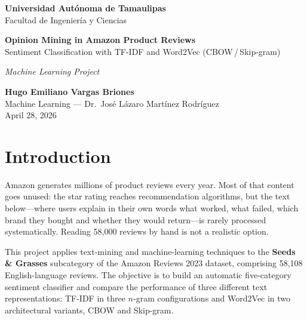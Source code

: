 \documentclass[12pt, letterpaper]{article}
\begin{document}
\begin{titlepage}
  \centering
  \vspace*{2cm}
  {\large\bfseries Universidad Autónoma de Tamaulipas\\[4pt]}
  {\normalsize Facultad de Ingeniería y Ciencias\\[2.5cm]}

  {\LARGE\bfseries Opinion Mining in Amazon Product Reviews\\[8pt]}
  {\large Sentiment Classification with TF-IDF and Word2Vec
    (CBOW\,/\,Skip-gram)\\[1.8cm]}

  {\normalsize\itshape Machine Learning Project\\[1.5cm]}

  {\large\bfseries Hugo Emiliano Vargas Briones\\[6pt]}
  {\normalsize Machine Learning --- Dr.\ José Lázaro Martínez Rodríguez\\[6pt]}
  {\normalsize April 28, 2026}

  \vfill
\end{titlepage}

\tableofcontents
\newpage

\section{Introduction}

Amazon generates millions of product reviews every year. Most of that content
goes unused: the star rating reaches recommendation algorithms, but the text
below---where users explain in their own words what worked, what failed, which
brand they bought and whether they would return---is rarely processed
systematically. Reading 58,000 reviews by hand is not a realistic option.

This project applies text-mining and machine-learning techniques to the
\textbf{Seeds \& Grasses} subcategory of the Amazon Reviews 2023 dataset,
comprising 58,108 English-language reviews. The objective is to build an
automatic five-category sentiment classifier and compare the performance of
three different text representations: TF-IDF in three $n$-gram configurations
and Word2Vec in two architectural variants, CBOW and Skip-gram.
\end{document}
